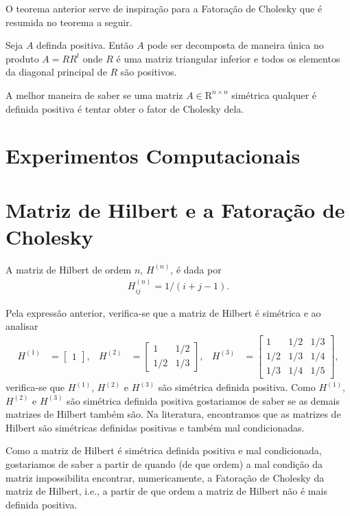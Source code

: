\documentclass[12pt,a4paper]{article}
\begin{document}
O teorema anterior serve de inspiração para a Fatoração de Cholesky que é
resumida no teorema a seguir.
\begin{teo}
    Seja $A$ definda positiva. Então $A$ pode ser decomposta de maneira única no
    produto $A = R R^t$ onde $R$ é uma matriz triangular inferior e todos os
    elementos da diagonal principal de $R$ são positivos.
\end{teo}

A melhor maneira de saber se uma matriz $A \in \mathrm{R}^{n \times n}$
simétrica qualquer é definida positiva é tentar obter o fator de Cholesky dela.

\section{Experimentos Computacionais}

\section{Matriz de Hilbert e a Fatoração de Cholesky}
A matriz de Hilbert de ordem $n$, $H^{(n)}$, é dada por
\begin{align*}
    H^{(n)}_{ij} = 1 / (i + j - 1).
\end{align*}

Pela expressão anterior, verifica-se que a matriz de Hilbert é simétrica e ao
analisar
\begin{align*}
    H^{(1)} &= \begin{bmatrix}
        1
    \end{bmatrix}, & H^{(2)} &= \begin{bmatrix}
        1 & 1/2 \\
        1/2 & 1/3
    \end{bmatrix}, & H^{(3)} &= \begin{bmatrix}
        1 & 1/2 & 1/3 \\
        1/2 & 1/3 & 1/4 \\
        1/3 & 1/4 & 1/5
    \end{bmatrix},
\end{align*}
verifica-se que $H^{(1)}$, $H^{(2)}$ e $H^{(3)}$ são simétrica definida
positiva. Como $H^{(1)}$, $H^{(2)}$ e $H^{(3)}$ são simétrica definida positiva
gostariamos de saber se as demais matrizes de Hilbert também são. Na literatura,
encontramos que as matrizes de Hilbert são simétricas definidas positivas e
também mal condicionadas. 

Como a matriz de Hilbert é simétrica definida positiva e mal condicionada,
gostariamos de saber a partir de quando (de que ordem) a mal condição da matriz
impossibilita encontrar, numericamente, a Fatoração de Cholesky da matriz de
Hilbert, i.e., a partir de que ordem a matriz de Hilbert não é mais definida
positiva.
\end{document}
